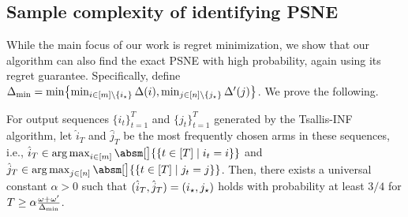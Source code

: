 \subsection{Sample complexity of identifying PSNE}\label{sec:PSNE_complexity}
While the main focus of our work is regret minimization, we show that our algorithm can also find the exact PSNE with high probability, again using its regret guarantee.
Specifically,
define $\Delta_{\min} = \min\cbr{ \min_{i \in [m] \setminus \{ \istar \}} \Deltar(i), \min_{j \in [n] \setminus \{ \jstar \}} \Deltac(j) }$.
We prove the following.
\begin{theorem}
    For output sequences $\{ i_t \}_{t=1}^T$ and $\{ j_t \}_{t=1}^T$ generated by the Tsallis-INF algorithm,
    let $\hat{i}_T$ and $\hat{j}_T$ be the most frequently chosen arms in these sequences,
    i.e.,
    $\hat{i}_T \in \argmax_{ i \in [m] } \absm[\big]{\{ t \in [T] \mid i_t = i \} }$ and
    $\hat{j}_T \in \argmax_{ j \in [n] } \absm[\big]{ \{ t \in [T] \mid j_t = j \} }$.
    Then,
    there exists a universal constant $\alpha > 0$ such that
    $(\hat{i}_T, \hat{j}_T) = (i_{\star}, j_{\star})$
    holds with probability at least $3/4$ for
    $T \ge \alpha \frac{\omega + \omega'}{\Delta_{\min}}$.
\end{theorem}



